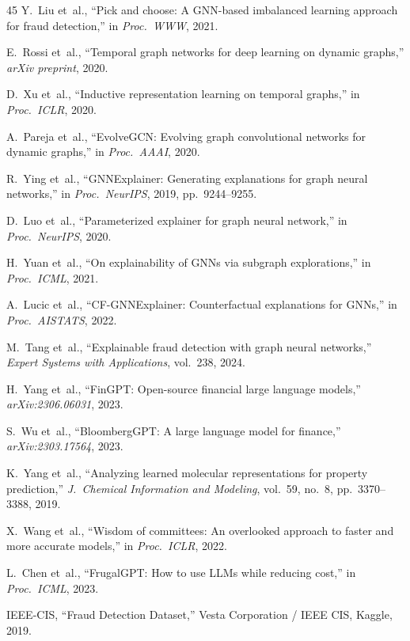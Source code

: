 \documentclass[journal]{IEEEtran}
\begin{document}
\begin{thebibliography}{45}
 Y.~Liu et~al., ``Pick and choose: A GNN-based imbalanced learning approach for fraud detection,'' in \emph{Proc.\ WWW}, 2021.

 E.~Rossi et~al., ``Temporal graph networks for deep learning on dynamic graphs,'' \emph{arXiv preprint}, 2020.

 D.~Xu et~al., ``Inductive representation learning on temporal graphs,'' in \emph{Proc.\ ICLR}, 2020.

 A.~Pareja et~al., ``EvolveGCN: Evolving graph convolutional networks for dynamic graphs,'' in \emph{Proc.\ AAAI}, 2020.

 R.~Ying et~al., ``GNNExplainer: Generating explanations for graph neural networks,'' in \emph{Proc.\ NeurIPS}, 2019, pp.~9244--9255.

 D.~Luo et~al., ``Parameterized explainer for graph neural network,'' in \emph{Proc.\ NeurIPS}, 2020.

 H.~Yuan et~al., ``On explainability of GNNs via subgraph explorations,'' in \emph{Proc.\ ICML}, 2021.

 A.~Lucic et~al., ``CF-GNNExplainer: Counterfactual explanations for GNNs,'' in \emph{Proc.\ AISTATS}, 2022.

 M.~Tang et~al., ``Explainable fraud detection with graph neural networks,'' \emph{Expert Systems with Applications}, vol.~238, 2024.

 H.~Yang et~al., ``FinGPT: Open-source financial large language models,'' \emph{arXiv:2306.06031}, 2023.

 S.~Wu et~al., ``BloombergGPT: A large language model for finance,'' \emph{arXiv:2303.17564}, 2023.

 K.~Yang et~al., ``Analyzing learned molecular representations for property prediction,'' \emph{J.\ Chemical Information and Modeling}, vol.~59, no.~8, pp.~3370--3388, 2019.

 X.~Wang et~al., ``Wisdom of committees: An overlooked approach to faster and more accurate models,'' in \emph{Proc.\ ICLR}, 2022.

 L.~Chen et~al., ``FrugalGPT: How to use LLMs while reducing cost,'' in \emph{Proc.\ ICML}, 2023.

 IEEE-CIS, ``Fraud Detection Dataset,'' Vesta Corporation / IEEE CIS, Kaggle, 2019.


\end{thebibliography}
\end{document}
